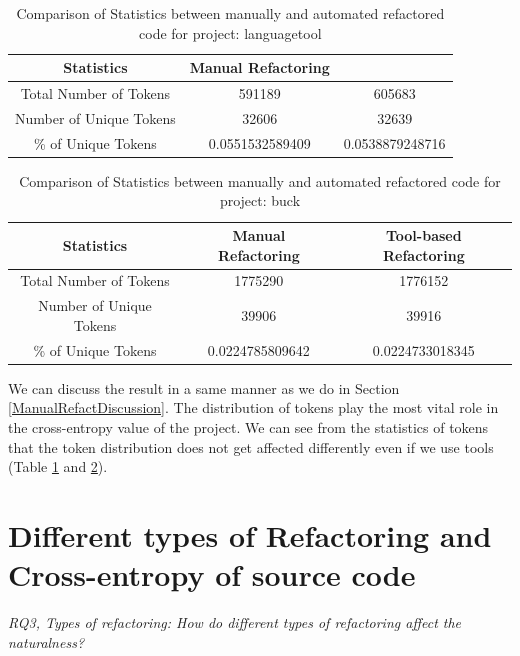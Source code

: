 \documentclass[conference]{IEEEtran}
\begin{document}
\begin{table}[t]
\centering
\caption{Comparison of Statistics between manually and automated refactored code for project: languagetool}
\label{ComparisionLanguagetoll}
 \begin{tabular}{||c c c ||} 
 \hline
 Statistics & Manual Refactoring \\ [0.5ex] 
 \hline\hline
 Total Number of Tokens & 591189 & 605683 \\ 
 \hline
   Number of Unique Tokens & 32606 & 32639 \\
 \hline
	\% of Unique Tokens  & 0.0551532589409 & 0.0538879248716  \\ [1ex]  
 \hline
\end{tabular}
\end{table}


\begin{table}[t]
\centering
\caption{Comparison of Statistics between manually and automated refactored code for project: buck}
\label{ComparisionBuck}
 \begin{tabular}{||c c c ||} 
 \hline
 Statistics & Manual Refactoring & Tool-based Refactoring \\[0.5ex] 
 \hline\hline
 Total Number of Tokens & 1775290 & 1776152 \\ 
 \hline
   Number of Unique Tokens & 39906 & 39916  \\
 \hline
	\% of Unique Tokens  &  0.0224785809642 & 0.0224733018345 \\ [1ex]  
 \hline
\end{tabular}
\end{table}

We can discuss the result in a same manner as we do in Section \ref{ManualRefactDiscussion}. The distribution of tokens play the most vital role in the cross-entropy value of the project. We can see from the statistics of tokens that the token distribution does not get affected differently even if we use tools (Table \ref{ComparisionLanguagetoll} and \ref{ComparisionBuck}).

\noindent{}



\section{Different types of Refactoring and Cross-entropy of source code}
\textit{RQ3, Types of refactoring: How do different types of refactoring affect the naturalness?}
\end{document}
